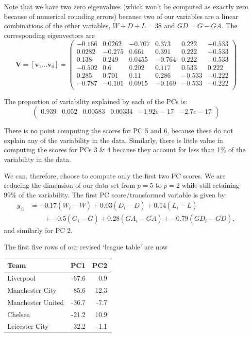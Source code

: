 \documentclass[]{book}
\theoremstyle{definition}
\theoremstyle{definition}
\theoremstyle{definition}
\theoremstyle{remark}
\begin{document}
Note that we have two zero eigenvalues (which won't be computed as exactly zero because of numerical rounding errors) because two of our variables are a linear combinations of the other variables, \(W+D+L = 38\) and \(GD=G-GA\). The corresponding eigenvectors are
\[\mathbf V= [\mathbf v_1 \ldots \mathbf v_6] =\begin{pmatrix}-0.166&0.0262&-0.707&0.373&0.222&-0.533 \\0.0282&-0.275&0.661&0.391&0.222&-0.533 \\0.138&0.249&0.0455&-0.764&0.222&-0.533 \\-0.502&0.6&0.202&0.117&0.533&0.222 \\0.285&0.701&0.11&0.286&-0.533&-0.222 \\-0.787&-0.101&0.0915&-0.169&-0.533&-0.222 \\\end{pmatrix}\]

The proportion of variability explained by each of the PCs is:
\[
\begin{pmatrix}0.939&0.052&0.00583&0.00334&-1.92e-17&-2.7e-17 \\\end{pmatrix}
\]

There is no point computing the scores for PC 5 and 6, because these do not explain any of the variability in the data. Similarly, there is little value in computing the scores for PCs 3 \& 4 because they account for less than 1\% of the variability in the data.

We can, therefore, choose to compute only the first two PC scores. We are reducing the dimension of our data set from \(p=5\) to \(p=2\) while still retaining 99\% of the variability. The first PC score/transformed variable is given by:
\begin{align*}
y_{i1} &= -0.17(W_i-\bar{W}) +0.03(D_i-\bar{D}) +0.14(L_i-\bar{L})\\
& \qquad +-0.5(G_i-\bar{G}) +0.28(GA_i-\bar{GA})+-0.79(GD_i-\bar{GD}),
\end{align*}
and similarly for PC 2.

The first five rows of our revised `league table' are now

\begin{table}[H]
\centering
\begin{tabular}{lrr}
\toprule
Team & PC1 & PC2\\
\midrule
Liverpool & -67.6 & 0.9\\
Manchester City & -85.6 & 12.3\\
Manchester United & -36.7 & -7.7\\
Chelsea & -21.2 & 10.9\\
Leicester City & -32.2 & -1.1\\
\bottomrule
\end{tabular}
\end{table}
\end{document}
